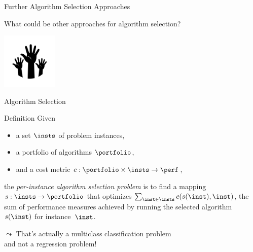 \begin{frame}[c]{Further Algorithm Selection Approaches}

\centering
What could be other approaches for algorithm selection?

\bigskip

\includegraphics[width=0.2\textwidth]{images/hands.png}

\end{frame}

\begin{frame}[c]{Algorithm Selection~}

\begin{block}{Definition}
Given 
\begin{itemize}
  \item a set $\insts$ of problem instances,
  \item a portfolio of algorithms $\portfolio$,
  \item and a cost metric $c:  \portfolio \times \insts \rightarrow \perf$,   
\end{itemize}
 
the \emph{per-instance algorithm selection problem} is to find a mapping 
$s: \insts \rightarrow \portfolio$ 
that optimizes $\sum_{\inst \in \insts} c(s(\inst),\inst)$, 
the sum of performance measures achieved by running the selected algorithm $s(\inst)$ for instance~$\inst$.
\end{block}

\bigskip
\pause

$\leadsto$ \alert{That's actually a multiclass classification problem\\ and not a regression problem!}

\end{frame}

